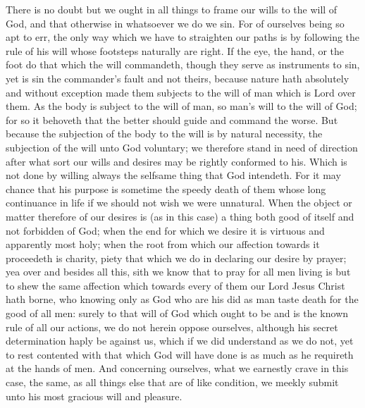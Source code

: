 There is no doubt but we ought in all things to frame our wills to the will of God, and that otherwise in whatsoever we do we sin. For of ourselves being so apt to err, the only way which we have to straighten our paths is by following the rule of his will whose footsteps naturally are right. If the eye, the hand, or the foot do that which the will commandeth, though they serve as instruments to sin, yet is sin the commander’s fault and not theirs, because nature hath absolutely and without exception made them subjects to the will of man which is Lord over them. As the body is subject to the will of man, so man’s will to the will of God; for so it behoveth that the better should guide and command the worse. But because the subjection of the body to the will is by natural  necessity, the subjection of the will unto God voluntary; we therefore stand in need of direction after what sort our wills and desires may be rightly conformed to his. Which is not done by willing always the selfsame thing that God intendeth. For it may chance that his purpose is sometime the speedy death of them whose long continuance in life if we should not wish we were unnatural.
When the object or matter therefore of our desires is (as in this case) a thing both good of itself and not forbidden of God; when the end for which we desire it is virtuous and apparently most holy; when the root from which our affection towards it proceedeth is charity, piety that which we do in declaring our desire by prayer; yea over and besides all this, sith we know that to pray for all men living is but to shew the same affection which towards every of them our Lord Jesus Christ hath borne, who knowing only as God who are his did as man taste death for the good of all men: surely to that will of God which ought to be and is the known rule of all our actions, we do not herein oppose ourselves, although his secret determination haply be against us, which if we did understand as we do not, yet to rest contented with that which God will have done is as much as he requireth at the hands of men. And concerning ourselves, what we earnestly crave in this case, the same, as all things else that are of like condition, we meekly submit unto his most gracious will and pleasure.
